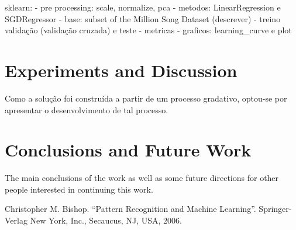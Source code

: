 \documentclass[conference]{IEEEtran}
\begin{document}
sklearn:
- pre processing: scale, normalize, pca
- metodos: LinearRegression e SGDRegressor
- base: subset of the Million Song Dataset (descrever)
- treino validação (validação cruzada) e teste
- metricas
- graficos: learning\_curve e plot

\section{Experiments and Discussion}

Como a solução foi construída a partir de um processo gradativo, optou-se por apresentar o desenvolvimento de tal processo.


\section{Conclusions and Future Work}

The main conclusions of the work as well as some future directions for other people interested in continuing this work.

\begin{thebibliography}{00}
 Christopher M. Bishop. ``Pattern Recognition and Machine Learning''. Springer-Verlag New York, Inc., Secaucus, NJ, USA, 2006.
\end{thebibliography}
\end{document}
